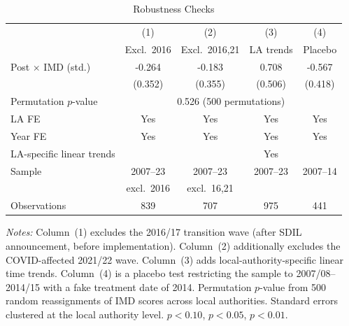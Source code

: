 \begin{table}[H]
\centering
\caption{Robustness Checks}
\label{tab:robustness}
\begin{threeparttable}
\begin{tabular}{lcccc}
\toprule
 & (1) & (2) & (3) & (4) \\
 & Excl.\ 2016 & Excl.\ 2016,21 & LA trends & Placebo \\
\midrule
Post $\times$ IMD (std.) & -0.264 & -0.183 & 0.708 & -0.567 \\
 & (0.352) & (0.355) & (0.506) & (0.418) \\
\addlinespace
Permutation $p$-value & \multicolumn{4}{c}{0.526 (500 permutations)} \\
\midrule
LA FE & Yes & Yes & Yes & Yes \\
Year FE & Yes & Yes & Yes & Yes \\
LA-specific linear trends & & & Yes & \\
Sample & 2007--23 & 2007--23 & 2007--23 & 2007--14 \\
 & excl.\ 2016 & excl.\ 16,21 & & \\
Observations & 839 & 707 & 975 & 441 \\
\bottomrule
\end{tabular}
\begin{tablenotes}[flushleft]
\small
\item \textit{Notes:} Column~(1) excludes the 2016/17 transition wave (after SDIL announcement, before implementation). Column~(2) additionally excludes the COVID-affected 2021/22 wave. Column~(3) adds local-authority-specific linear time trends. Column~(4) is a placebo test restricting the sample to 2007/08--2014/15 with a fake treatment date of 2014. Permutation $p$-value from 500 random reassignments of IMD scores across local authorities. Standard errors clustered at the local authority level. \sym{*} $p<0.10$, \sym{**} $p<0.05$, \sym{***} $p<0.01$.
\end{tablenotes}
\end{threeparttable}
\end{table}

